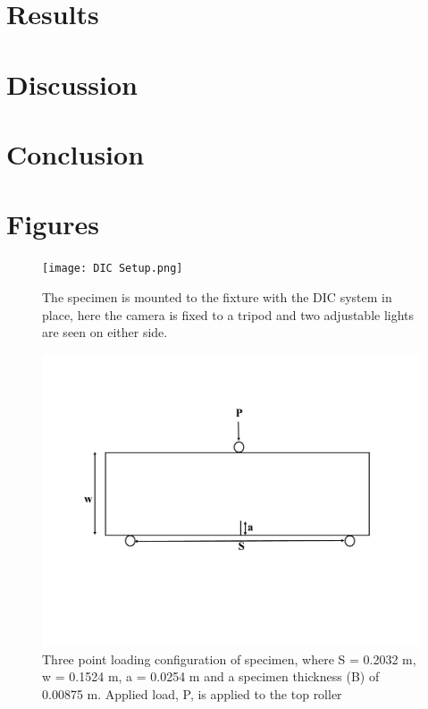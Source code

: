 \documentclass[12pt]{article}
\begin{document}
\section{Results}%

\section{Discussion}%

\section{Conclusion}%

\section{Figures}
\begin{figure}[H]
	\centering
	\texttt{[image: DIC Setup.png]}
	\caption{The specimen is mounted to the fixture with the DIC system in place, here the camera is fixed to a tripod and two adjustable lights are seen on either side.}
	\label{fig:DIC}
\end{figure}

\begin{figure}[H]
	\centering
	\includegraphics[width=1\textwidth]{Geometry.png}
	\caption{Three point loading configuration of specimen, where S = 0.2032 m, w = 0.1524 m, a = 0.0254 m and a specimen thickness (B) of 0.00875 m. Applied load, P, is applied to the top roller}
	\label{fig:Geometry}
\end{figure}
\end{document}
